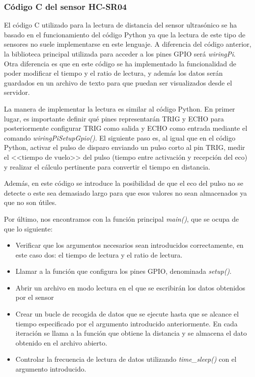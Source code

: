 \subsubsection{Código C del sensor HC-SR04}

El código C utilizado para la lectura de distancia del sensor ultrasónico se ha basado en el funcionamiento del código Python ya que la lectura de este tipo de sensores no suele implementarse en este lenguaje. A diferencia del código anterior, la biblioteca principal utilizada para acceder a los pines GPIO será \textit{wiringPi}. Otra diferencia es que en este código se ha implementado la funcionalidad de poder modificar el tiempo y el ratio de lectura, y además los datos serán guardados en un archivo de texto para que puedan ser visualizados desde el servidor.

La manera de implementar la lectura es similar al código Python. En primer lugar, es importante definir qué pines representarán TRIG y ECHO para posteriormente configurar TRIG como salida y ECHO como entrada mediante el comando \textit{wiringPiSetupGpio()}. El siguiente paso es, al igual que en el código Python, activar el pulso de disparo enviando un pulso corto al pin TRIG, medir el <<tiempo de vuelo>> del pulso (tiempo entre activación y recepción del eco) y realizar el cálculo pertinente para convertir el tiempo en distancia.

Además, en este código se introduce la posibilidad de que el eco del pulso no se detecte o este sea demasiado largo para que esos valores no sean almacenados ya que no son útiles.

Por último, nos encontramos con la función principal \textit{main()}, que se ocupa de que lo siguiente:
\begin{itemize}
    \item  Verificar que los argumentos necesarios sean introducidos correctamente, en este caso dos: el tiempo de lectura y el ratio de lectura.
    \item Llamar a la función que configura los pines GPIO, denominada \textit{setup()}.
    \item Abrir un archivo en modo lectura en el que se escribirán los datos obtenidos por el sensor
    \item Crear un bucle de recogida de datos que se ejecute hasta que se alcance el tiempo especificado por el argumento introducido anteriormente. En cada iteración se llama a la función que obtiene la distancia y se almacena el dato obtenido en el archivo abierto.
    \item Controlar la frecuencia de lectura de datos utilizando \textit{time\_sleep()} con el argumento introducido.
\end{itemize}
\clearpage

